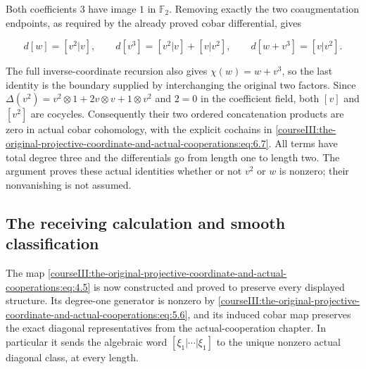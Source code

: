 Both coefficients \(3\) have image \(1\) in \(\mathbb F_2\). Removing exactly the two coaugmentation endpoints, as required by the already proved cobar differential, gives

\begin{equation}
d[w]=[v^2|v],\qquad
 d[v^3]=[v^2|v]+[v|v^2],\qquad
 d[w+v^3]=[v|v^2].
 \label{courseIII:the-original-projective-coordinate-and-actual-cooperations:eq:6.7}
\end{equation}

The full inverse-coordinate recursion also gives \(\chi(w)=w+v^3\), so the last identity is the boundary supplied by interchanging the original two factors. Since \(\Delta(v^2)=v^2\otimes1+2v\otimes v+1\otimes v^2\) and \(2=0\) in the coefficient field, both \([v]\) and \([v^2]\) are cocycles. Consequently their two ordered concatenation products are zero in actual cobar cohomology, with the explicit cochains in \eqref{courseIII:the-original-projective-coordinate-and-actual-cooperations:eq:6.7}. All terms have total degree three and the differentials go from length one to length two. The argument proves these actual identities whether or not \(v^2\) or \(w\) is nonzero; their nonvanishing is not assumed.

\subsection{The receiving calculation and smooth classification}
\label{courseIII:the-original-projective-coordinate-and-actual-cooperations:projective-scope}

\label{courseIII:the-original-projective-coordinate-and-actual-cooperations:section-7}

The map \eqref{courseIII:the-original-projective-coordinate-and-actual-cooperations:eq:4.5} is now constructed and proved to preserve every displayed structure. Its degree-one generator is nonzero by \eqref{courseIII:the-original-projective-coordinate-and-actual-cooperations:eq:5.6}, and its induced cobar map preserves the exact diagonal representatives from the actual-cooperation chapter. In particular it sends the algebraic word \([\xi_1|\cdots|\xi_1]\) to the unique nonzero actual diagonal class, at every length.

